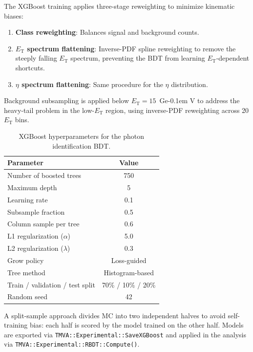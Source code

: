\documentclass[11pt,a4paper]{article}
\newcommand{\ET}{\ensuremath{E_{\text{T}}}\xspace}
\newcommand{\GeV}{\ifmmode {\mathrm{\ Ge\kern -0.1em V}}\else\textrm{Ge\kern -0.1em V}\fi\xspace}
\begin{document}
The XGBoost training applies three-stage reweighting to minimize kinematic
biases:
\begin{enumerate}
    \item \textbf{Class reweighting}: Balances signal and background counts.
    \item \textbf{\ET spectrum flattening}: Inverse-PDF spline reweighting to
      remove the steeply falling \ET spectrum, preventing the BDT from learning
      \ET-dependent shortcuts.
    \item \textbf{$\eta$ spectrum flattening}: Same procedure for the $\eta$
      distribution.
\end{enumerate}

Background subsampling is applied below $\ET = 15$~\GeV to address the
heavy-tail problem in the low-\ET region, using inverse-PDF reweighting across
20 \ET bins.

\begin{table}[H]
    \centering
    \caption{XGBoost hyperparameters for the photon identification BDT.}
    \label{tab:xgb_params}
    \begin{tabular}{lc}
        \toprule
        Parameter & Value \\
        \midrule
        Number of boosted trees & 750 \\
        Maximum depth & 5 \\
        Learning rate & 0.1 \\
        Subsample fraction & 0.5 \\
        Column sample per tree & 0.6 \\
        L1 regularization ($\alpha$) & 5.0 \\
        L2 regularization ($\lambda$) & 0.3 \\
        Grow policy & Loss-guided \\
        Tree method & Histogram-based \\
        \midrule
        Train / validation / test split & 70\% / 10\% / 20\% \\
        Random seed & 42 \\
        \bottomrule
    \end{tabular}
\end{table}

A split-sample approach divides MC into two independent halves to avoid
self-training bias: each half is scored by the model trained on the other half.
Models are exported via \texttt{TMVA::Experimental::SaveXGBoost} and applied in
the analysis via \texttt{TMVA::Experimental::RBDT::Compute()}.
\end{document}
